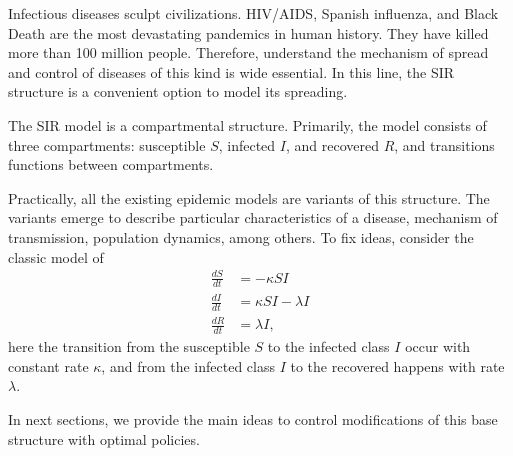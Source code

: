   Infectious diseases sculpt civilizations.  HIV/AIDS, Spanish influenza, and
Black Death are the most devastating pandemics in human history. They have
killed more than 100 million people. Therefore, understand the mechanism of
spread and control of diseases of this kind is wide essential.
In this line, the SIR structure is a convenient option to model its 
spreading. 

  The SIR model is a compartmental structure. Primarily, the model consists of 
three compartments: susceptible $S$, infected $I$, and recovered $R$, %
 and transitions functions between compartments.

  Practically, all the existing epidemic models are variants of this structure. 
The variants emerge to describe particular characteristics of a disease, 
mechanism of transmission, population dynamics, among others. 
To fix ideas, consider the classic model of 
\citet{Kermac}
\begin{equation}
  \begin{aligned}
    \frac{dS}{dt} & = - \kappa SI
      \\
    \frac{dI}{dt} & = \kappa SI - \lambda I
      \\
    \frac{dR}{dt} & = \lambda I,
  \end{aligned}
\end{equation}
here the transition from the susceptible $S$ to the infected class $I$ 
occur with constant rate $\kappa$, and from  the infected class $I$ to the 
recovered happens with rate $\lambda$.

In next sections, we provide the main ideas to control modifications of this 
base structure with optimal policies.